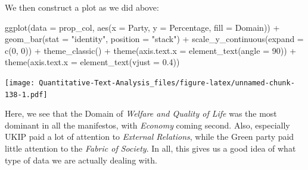 \documentclass[
]{book}
\newenvironment{Shaded}{\begin{snugshade}}{\end{snugshade}}
\newcommand{\AttributeTok}[1]{\textcolor[rgb]{0.77,0.63,0.00}{#1}}
\newcommand{\DecValTok}[1]{\textcolor[rgb]{0.00,0.00,0.81}{#1}}
\newcommand{\FloatTok}[1]{\textcolor[rgb]{0.00,0.00,0.81}{#1}}
\newcommand{\FunctionTok}[1]{\textcolor[rgb]{0.00,0.00,0.00}{#1}}
\newcommand{\NormalTok}[1]{#1}
\newcommand{\OtherTok}[1]{\textcolor[rgb]{0.56,0.35,0.01}{#1}}
\newcommand{\SpecialCharTok}[1]{\textcolor[rgb]{0.00,0.00,0.00}{#1}}
\newcommand{\StringTok}[1]{\textcolor[rgb]{0.31,0.60,0.02}{#1}}
\begin{document}
\begin{Shaded}
\end{Shaded}

We then construct a plot as we did above:

\begin{Shaded}
\begin{Highlighting}[]
\FunctionTok{ggplot}\NormalTok{(}\AttributeTok{data =}\NormalTok{ prop\_col, }\FunctionTok{aes}\NormalTok{(}\AttributeTok{x =}\NormalTok{ Party, }\AttributeTok{y =}\NormalTok{ Percentage, }\AttributeTok{fill =}\NormalTok{ Domain)) }\SpecialCharTok{+}
    \FunctionTok{geom\_bar}\NormalTok{(}\AttributeTok{stat =} \StringTok{"identity"}\NormalTok{, }\AttributeTok{position =} \StringTok{"stack"}\NormalTok{) }\SpecialCharTok{+} \FunctionTok{scale\_y\_continuous}\NormalTok{(}\AttributeTok{expand =} \FunctionTok{c}\NormalTok{(}\DecValTok{0}\NormalTok{,}
    \DecValTok{0}\NormalTok{)) }\SpecialCharTok{+} \FunctionTok{theme\_classic}\NormalTok{() }\SpecialCharTok{+} \FunctionTok{theme}\NormalTok{(}\AttributeTok{axis.text.x =} \FunctionTok{element\_text}\NormalTok{(}\AttributeTok{angle =} \DecValTok{90}\NormalTok{)) }\SpecialCharTok{+}
    \FunctionTok{theme}\NormalTok{(}\AttributeTok{axis.text.x =} \FunctionTok{element\_text}\NormalTok{(}\AttributeTok{vjust =} \FloatTok{0.4}\NormalTok{))}
\end{Highlighting}
\end{Shaded}

\texttt{[image: Quantitative-Text-Analysis\_files/figure-latex/unnamed-chunk-138-1.pdf]}

Here, we see that the Domain of \emph{Welfare and Quality of Life} was the most dominant in all the manifestos, with \emph{Economy} coming second. Also, especially UKIP paid a lot of attention to \emph{External Relations}, while the Green party paid little attention to the \emph{Fabric of Society}. In all, this gives us a good idea of what type of data we are actually dealing with.
\end{document}
